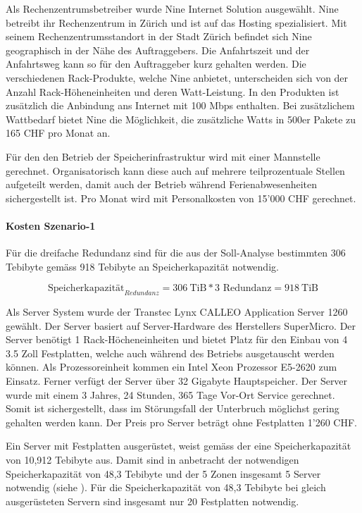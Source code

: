 Als Rechenzentrumsbetreiber wurde Nine Internet Solution ausgewählt. Nine betreibt ihr Rechenzentrum in Zürich und ist auf das Hosting spezialisiert. Mit seinem Rechenzentrumsstandort in der Stadt Zürich befindet sich Nine geographisch in der Nähe des Auftraggebers. Die Anfahrtszeit und der Anfahrtsweg kann so für den Auftraggeber kurz gehalten werden. Die verschiedenen Rack-Produkte, welche Nine anbietet, unterscheiden sich von der Anzahl Rack-Höheneinheiten und deren Watt-Leistung. In den Produkten ist zusätzlich die Anbindung ans Internet mit 100 Mbps enthalten. Bei zusätzlichem Wattbedarf bietet Nine die Möglichkeit, die zusätzliche Watts in 500er Pakete zu 165 CHF pro Monat an.

Für den den Betrieb der Speicherinfrastruktur wird mit einer Mannstelle gerechnet. Organisatorisch kann diese auch auf mehrere teilprozentuale Stellen aufgeteilt werden, damit auch der Betrieb während Ferienabwesenheiten sichergestellt ist. Pro Monat wird mit Personalkosten von 15'000 CHF gerechnet.


\paragraph*{Kosten Szenario-1}

Für die dreifache Redundanz sind für die aus der Soll-Analyse bestimmten 306 Tebibyte gemäss  918 Tebibyte an Speicherkapazität notwendig.

\begin{equation}
\mbox{Speicherkapazität}_{Redundanz} = 306 \mathrm{\ TiB} * 3 \mbox{\ Redundanz} = 918 \mathrm{\ TiB}
\label{eqn:SpeicherkapazitätS1}
\end{equation}


Als Server System wurde der Transtec Lynx CALLEO Application Server 1260 gewählt. Der Server basiert auf Server-Hardware des Herstellers SuperMicro. Der Server benötigt 1 Rack-Höcheneinheiten und bietet Platz für den Einbau von 4 3.5 Zoll Festplatten, welche auch während des Betriebs ausgetauscht werden können. Als Prozessoreinheit kommen ein Intel Xeon Prozessor E5-2620 zum Einsatz. Ferner verfügt der Server über 32 Gigabyte Hauptspeicher. Der Server wurde mit einem 3 Jahres, 24 Stunden, 365 Tage Vor-Ort Service gerechnet. Somit ist sichergestellt, dass im Störungsfall der Unterbruch möglichst gering gehalten werden kann. Der Preis pro Server beträgt ohne Festplatten 1'260 CHF.


Ein Server mit Festplatten ausgerüstet, weist gemäss der  eine Speicherkapazität von 10,912 Tebibyte aus. Damit sind in anbetracht der notwendigen Speicherkapazität von 48,3 Tebibyte und der 5 Zonen insgesamt 5 Server notwendig (siehe ). Für die Speicherkapazität von 48,3 Tebibyte bei gleich ausgerüsteten Servern sind insgesamt nur 20 Festplatten notwendig.

